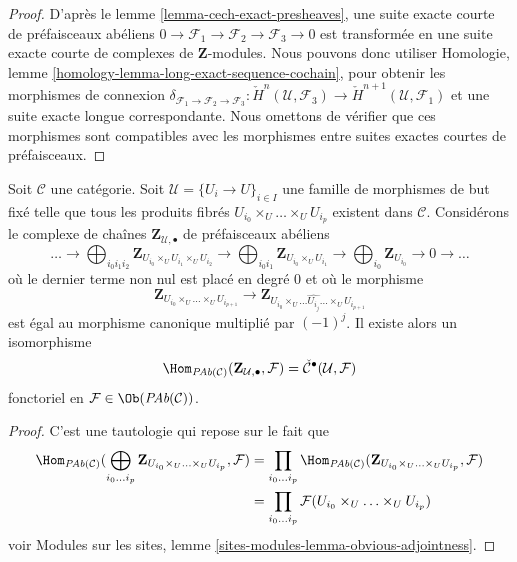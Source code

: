 \begin{proof}
D'après le
lemme \ref{lemma-cech-exact-presheaves},
une suite exacte courte de préfaisceaux abéliens
$0 \to \mathcal{F}_1 \to \mathcal{F}_2 \to \mathcal{F}_3 \to 0$
est transformée en une suite exacte courte de complexes de
$\mathbf{Z}$-modules. Nous pouvons donc utiliser
Homologie, lemme \ref{homology-lemma-long-exact-sequence-cochain},
pour obtenir les morphismes de connexion
$\delta_{\mathcal{F}_1 \to \mathcal{F}_2 \to \mathcal{F}_3} :
\check{H}^n(\mathcal{U}, \mathcal{F}_3) \to
\check{H}^{n + 1}(\mathcal{U}, \mathcal{F}_1)$
et une suite exacte longue correspondante. Nous omettons de vérifier
que ces morphismes sont compatibles avec les morphismes entre suites exactes
courtes de préfaisceaux.
\end{proof}

\begin{lemma}
\label{lemma-cech-map-into}
Soit $\mathcal{C}$ une catégorie. Soit $\mathcal{U} = \{U_i \to U\}_{i \in I}$
une famille de morphismes de but fixé telle que tous les produits fibrés
$U_{i_0} \times_U \ldots \times_U U_{i_p}$ existent dans $\mathcal{C}$.
Considérons le complexe de chaînes $\mathbf{Z}_{\mathcal{U}, \bullet}$
de préfaisceaux abéliens
$$
\ldots
\to
\bigoplus_{i_0i_1i_2} \mathbf{Z}_{U_{i_0} \times_U U_{i_1} \times_U U_{i_2}}
\to
\bigoplus_{i_0i_1} \mathbf{Z}_{U_{i_0} \times_U U_{i_1}}
\to
\bigoplus_{i_0} \mathbf{Z}_{U_{i_0}}
\to 0 \to \ldots
$$
où le dernier terme non nul est placé en degré $0$
et où le morphisme
$$
\mathbf{Z}_{U_{i_0} \times_U \ldots \times_U U_{i_{p + 1}}}
\longrightarrow
\mathbf{Z}_{U_{i_0} \times_U
\ldots \widehat{U_{i_j}} \ldots \times_U U_{i_{p + 1}}}
$$
est égal au morphisme canonique multiplié par $(-1)^j$.
Il existe alors un isomorphisme
$$
\Hom_{\textit{PAb}(\mathcal{C})}(\mathbf{Z}_{\mathcal{U}, \bullet}, \mathcal{F})
=
\check{\mathcal{C}}^\bullet(\mathcal{U}, \mathcal{F})
$$
fonctoriel en $\mathcal{F} \in \Ob(\textit{PAb}(\mathcal{C}))$.
\end{lemma}

\begin{proof}
C'est une tautologie qui repose sur le fait que
\begin{align*}
\Hom_{\textit{PAb}(\mathcal{C})}(
\bigoplus_{i_0 \ldots i_p}
\mathbf{Z}_{U_{i_0} \times_U \ldots \times_U U_{i_p}},
\mathcal{F})
& =
\prod_{i_0 \ldots i_p}
\Hom_{\textit{PAb}(\mathcal{C})}(
\mathbf{Z}_{U_{i_0} \times_U \ldots \times_U U_{i_p}},
\mathcal{F}) \\
& =
\prod_{i_0 \ldots i_p}
\mathcal{F}(U_{i_0} \times_U \ldots \times_U U_{i_p})
\end{align*}
voir Modules sur les sites, lemme \ref{sites-modules-lemma-obvious-adjointness}.
\end{proof}


